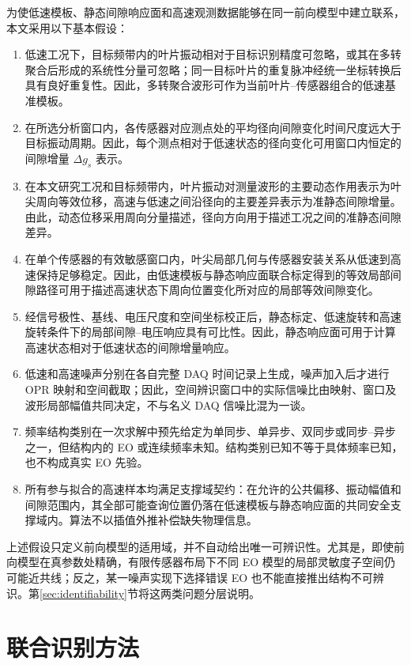 \documentclass[UTF8,12pt,a4paper]{ctexart}
\begin{document}
为使低速模板、静态间隙响应面和高速观测数据能够在同一前向模型中建立联系，本文采用以下基本假设：
\begin{enumerate}
  \item 低速工况下，目标频带内的叶片振动相对于目标识别精度可忽略，或其在多转聚合后形成的系统性分量可忽略；同一目标叶片的重复脉冲经统一坐标转换后具有良好重复性。因此，多转聚合波形可作为当前叶片--传感器组合的低速基准模板。
  \item 在所选分析窗口内，各传感器对应测点处的平均径向间隙变化时间尺度远大于目标振动周期。因此，每个测点相对于低速状态的径向变化可用窗口内恒定的间隙增量 $\Delta g_s$ 表示。
  \item 在本文研究工况和目标频带内，叶片振动对测量波形的主要动态作用表示为叶尖周向等效位移，高速与低速之间沿径向的主要差异表示为准静态间隙增量。由此，动态位移采用周向分量描述，径向方向用于描述工况之间的准静态间隙差异。
  \item 在单个传感器的有效敏感窗口内，叶尖局部几何与传感器安装关系从低速到高速保持足够稳定。因此，由低速模板与静态响应面联合标定得到的等效局部间隙路径可用于描述高速状态下周向位置变化所对应的局部等效间隙变化。
  \item 经信号极性、基线、电压尺度和空间坐标校正后，静态标定、低速旋转和高速旋转条件下的局部间隙--电压响应具有可比性。因此，静态响应面可用于计算高速状态相对于低速状态的间隙增量响应。
  \item 低速和高速噪声分别在各自完整 DAQ 时间记录上生成，噪声加入后才进行 OPR 映射和空间截取；因此，空间辨识窗口中的实际信噪比由映射、窗口及波形局部幅值共同决定，不与名义 DAQ 信噪比混为一谈。
  \item 频率结构类别在一次求解中预先给定为单同步、单异步、双同步或同步--异步之一，但结构内的 EO 或连续频率未知。结构类别已知不等于具体频率已知，也不构成真实 EO 先验。
  \item 所有参与拟合的高速样本均满足支撑域契约：在允许的公共偏移、振动幅值和间隙范围内，其全部可能查询位置仍落在低速模板与静态响应面的共同安全支撑域内。算法不以插值外推补偿缺失物理信息。
\end{enumerate}

上述假设只定义前向模型的适用域，并不自动给出唯一可辨识性。尤其是，即使前向模型在真参数处精确，有限传感器布局下不同 EO 模型的局部灵敏度子空间仍可能近共线；反之，某一噪声实现下选择错误 EO 也不能直接推出结构不可辨识。第\ref{sec:identifiability}节将这两类问题分层说明。

\section{联合识别方法}
\end{document}
